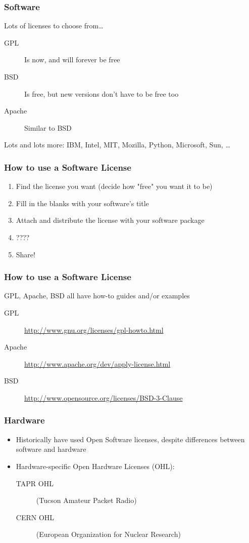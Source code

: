 \documentclass{beamer}
\begin{document}
\begin{frame}
  \frametitle{Software}

  Lots of licenses to choose from\ldots

  \begin{description}
  \item[GPL] Is now, and will forever be free
  \item[BSD] Is free, but new versions don't have to be free too
  \item[Apache] Similar to BSD
  \end{description}

  Lots and lots more: IBM, Intel, MIT, Mozilla, Python, Microsoft, Sun, \ldots

\end{frame}

\begin{frame}
  \frametitle{How to use a Software License}
  \begin{enumerate}
  \item Find the license you want (decide how "free" you want it to be)
  \item Fill in the blanks with your software's title
  \item Attach and distribute the license with your software package
  \item ????
  \item Share!
  \end{enumerate}
\end{frame}

\begin{frame}
  \frametitle{How to use a Software License}
  GPL, Apache, BSD all have how-to guides and/or examples
  \begin{description}
  \item[GPL] \href{http://www.gnu.org/licenses/gpl-howto.html}{http://www.gnu.org/licenses/gpl-howto.html}
  \item[Apache] \href{http://www.apache.org/dev/apply-license.html}{http://www.apache.org/dev/apply-license.html}
  \item[BSD] \href{http://www.opensource.org/licenses/BSD-3-Clause}{http://www.opensource.org/licenses/BSD-3-Clause}
  \end{description}
\end{frame}

\begin{frame}
  \frametitle{Hardware}
  \begin{itemize}
  \item Historically have used Open Software licenses, despite differences between software and hardware
  \item Hardware-specific Open Hardware Licenses (OHL):
    \begin{description}
    \item[TAPR OHL] (Tucson Amateur Packet Radio)
    \item[CERN OHL] (European Organization for Nuclear Research)
    \end{description}
  \end{itemize}
\end{frame}
\end{document}
